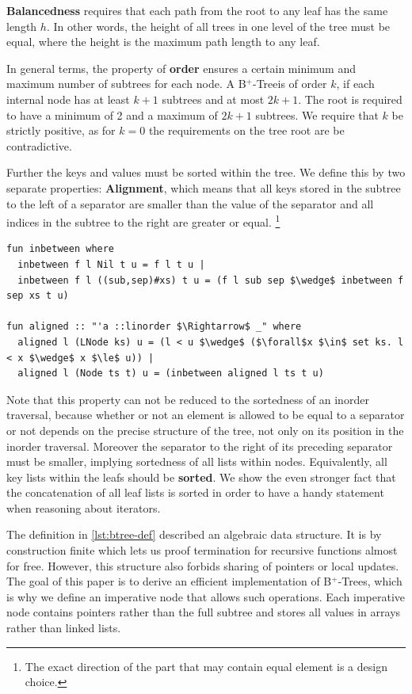 \documentclass[a4paper,UKenglish,cleveref, autoref, thm-restate]{lipics-v2021}
\newcommand{\btree}{B$^+$-Tree}
\newcommand{\btrees}{B$^+$-Trees}
\begin{document}
\textbf{Balancedness} requires
that each path from the root to any leaf has the same length $h$.
In other words, the height of all trees in one level of the tree must be equal,
where the height is the maximum path length to any leaf.

In general terms, the property of \textbf{order} ensures a certain minimum and maximum
number of subtrees for each node.
A \btree is of order $k$, if each internal node has at least $k+1$
subtrees and at most $2k+1$.
The root is required to have a minimum of 2 and a maximum of $2k+1$ subtrees.
We require that $k$ be strictly positive, as for $k = 0$ the requirements on the tree
root are be contradictive.

Further the keys and values must be sorted within the tree.
We define this by two separate properties: \textbf{Alignment}, which means that all keys stored
in the subtree to the left of a separator are smaller than the value of the separator
and all indices in the subtree to the right are greater or equal.
\footnote{
    The exact direction of the part that may contain equal element is a design choice.
}
\begin{lstlisting}[mathescape=true, language=Isabelle,label=lst:btree-alignment-def]
fun inbetween where
  inbetween f l Nil t u = f l t u |
  inbetween f l ((sub,sep)#xs) t u = (f l sub sep $\wedge$ inbetween f sep xs t u)

fun aligned :: "'a ::linorder $\Rightarrow$ _" where
  aligned l (LNode ks) u = (l < u $\wedge$ ($\forall$x $\in$ set ks. l < x $\wedge$ x $\le$ u)) |
  aligned l (Node ts t) u = (inbetween aligned l ts t u)
\end{lstlisting}


Note that this property can not be reduced to the sortedness of an inorder traversal,
because whether or not an element is allowed to be equal to a separator or not
depends on the precise structure of the tree, not only on its position in the inorder traversal.
Moreover the separator to the right of its preceding separator must be smaller,
implying sortedness of all lists within nodes.
Equivalently, all key lists within the leafs should be \textbf{sorted}.
We show the even stronger fact that the concatenation of all leaf lists
is sorted in order to have a handy statement when reasoning about iterators.

The definition in \autoref{lst:btree-def} described an algebraic data structure.
It is by construction finite which lets us proof termination for recursive functions almost for free.
However, this structure also forbids sharing of pointers or local updates.
The goal of this paper is to derive an efficient implementation
of \btrees, which is why we define an imperative node that allows such operations.
Each imperative node contains pointers rather than the full subtree and
stores all values in arrays rather than linked lists.
\end{document}
